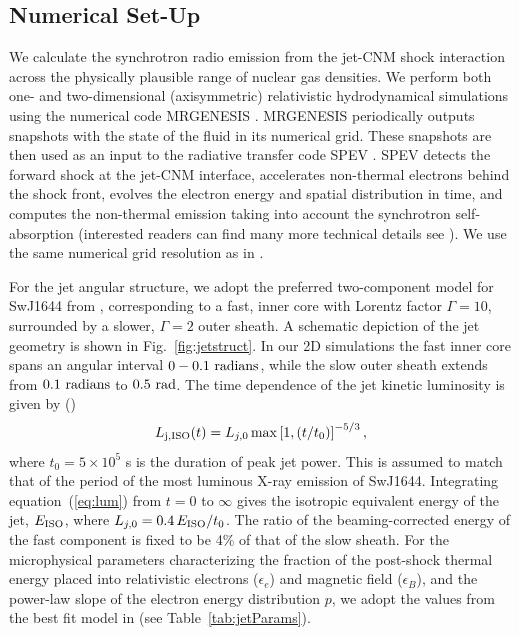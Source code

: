 \documentclass[usenatbib,fleqn]{mnras}
\begin{document}
\subsection{Numerical Set-Up}
\label{sec:numerical}
We calculate the synchrotron radio emission from the jet-CNM shock
interaction across the physically plausible range of nuclear gas
densities.  We perform both one- and two-dimensional (axisymmetric)
relativistic hydrodynamical simulations using the numerical code
MRGENESIS \citep{MimicaGianniosAloy2009}. MRGENESIS periodically
outputs snapshots with the state of the fluid in its numerical
grid. These snapshots are then used as an input to the radiative
transfer code SPEV \citep{Mimica+2009}. SPEV detects the forward shock
at the jet-CNM interface, accelerates non-thermal electrons behind
the shock front, evolves the electron energy and spatial distribution
in time, and computes the non-thermal emission taking into account the
synchrotron self-absorption (interested readers can find many more
technical details see \citealt{Mimica+2016}). We use the same
numerical grid resolution as in \citet{Mimica+2015}.

For the jet angular structure, we adopt the preferred two-component
model for SwJ1644 from \citet{Mimica+2015}, corresponding to a fast,
inner core with Lorentz factor $\Gamma = 10$, surrounded by a slower,
$\Gamma=2$ outer sheath. A schematic depiction of the jet geometry is
shown in Fig.~\ref{fig:jetstruct}.  In our 2D simulations the fast
inner core spans an angular interval $0-0.1\ {\rm radians}$, while the
slow outer sheath extends from $0.1\ {\rm radians}$ to $0.5\ {\rm
  rad}$.  The time dependence of the jet kinetic luminosity is given
by (\citealt{Mimica+2015})
\begin{equation}\label{eq:lum}
L_{\rm j, ISO}(t) = L_{j,0}\max\left[1, (t/t_0)\right]^{-5/3},
\end{equation}
where $t_0 = 5\times 10^5$ s is the duration of peak jet power. This
is assumed to match that of the period of the most luminous X-ray
emission of SwJ1644.  Integrating equation~(\ref{eq:lum}) from $t = 0$
to $\infty$ gives the isotropic equivalent energy of the jet, $E_{\rm
  ISO}$, where $L_{j,0}=0.4\, E_{\rm ISO}/t_0$.  The ratio of the
beaming-corrected energy of the fast component is fixed to be 4\% of
that of the slow sheath. For the microphysical parameters
characterizing the fraction of the post-shock thermal energy placed
into relativistic electrons ($\epsilon_e$) and magnetic field
($\epsilon_B$), and the power-law slope of the electron energy
distribution $p$, we adopt the values from the best fit model in
\citet{Mimica+2015} (see Table~\ref{tab:jetParams}).
\end{document}
